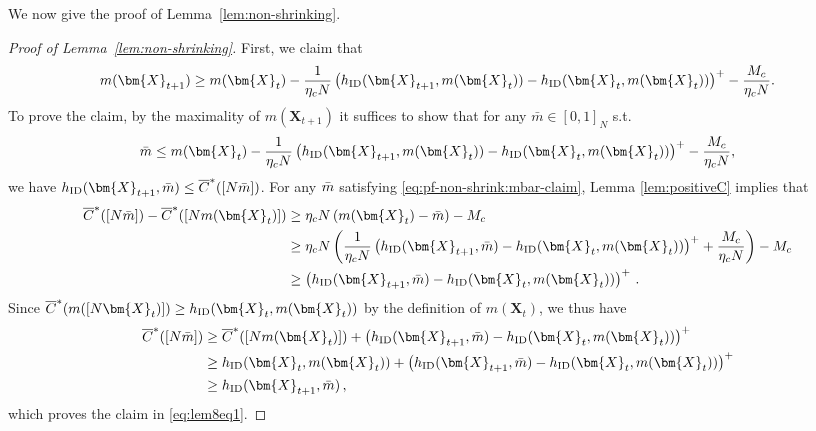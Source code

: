 \documentclass{article}
\theoremstyle{plain}
\theoremstyle{remark}
\newcommand{\ID}{\textnormal{ID}}
\newcommand{\rembud}{\overline{C}^*} %
\def\mX{{\bm{X}}}
\newcommand{\bracket}[1]{\left(#1\right)}
\begin{document}
We now give the proof of Lemma~\ref{lem:non-shrinking}.
\begin{proof}[Proof of Lemma~\ref{lem:non-shrinking}]
    First, we claim that 
    \begin{align}\label{eq:lem8eq1}
        m(\mX_{t+1})\geq m(\mX_t) - \frac{1}{\eta_c N} \bracket{h_{\ID}(\mX_{t+1},m(\mX_{t}))-h_{\ID}(\mX_t,m(\mX_t))}^+ - \frac{M_c}{\eta_cN}.
    \end{align}
    To prove the claim, by the maximality of $m(\mX_{t+1})$ it suffices to show that for any $\bar{m}\in [0,1]_N$ s.t.
    \begin{equation}
        \label{eq:pf-non-shrink:mbar-claim}
        \Bar{m}\leq m(\mX_t) - \frac{1}{\eta_cN} \bracket{h_{\ID}(\mX_{t+1},m(\mX_t))-h_{\ID}(\mX_t,m(\mX_t))}^+ -\frac{M_c}{\eta_cN},
    \end{equation}
    we have $h_{\ID}(\mX_{t+1},\Bar{m})\leq \rembud([N\Bar{m}])$.
    For any $\Bar{m}$ satisfying \eqref{eq:pf-non-shrink:mbar-claim}, Lemma \ref{lem:positiveC} implies that
    \begin{align*}
        \rembud([N\Bar{m}])-\rembud([Nm(\mX_t)])
        &\geq \eta_c N \bracket{m(\mX_t) - \bar{m}} - M_c  \\
        &\geq\eta_c N\bracket{\frac{1}{\eta_c N}\bracket{h_{\ID}(\mX_{t+1},\Bar{m})-h_{\ID}(\mX_t,m(\mX_t))}^++\frac{M_c}{\eta_cN} } - M_c\\
        &\geq\bracket{h_{\ID}(\mX_{t+1},\Bar{m})-h_{\ID}(\mX_t,m(\mX_t))}^+ \,.
    \end{align*}
    Since $\rembud(m([N\mX_t)])\geq h_{\ID}(\mX_t,m(\mX_t))$ by the definition of $m(\mX_t)$, we thus have
    \begin{align*}
        \rembud([N\Bar{m}])&\geq \rembud([Nm(\mX_t)]) + \bracket{h_{\ID}(\mX_{t+1},\Bar{m})-h_{\ID}(\mX_t,m(\mX_t))}^+ \\
        &\geq h_{\ID}(\mX_t,m(\mX_t)) + \bracket{h_{\ID}(\mX_{t+1},\Bar{m})-h_{\ID}(\mX_t,m(\mX_t))}^+ \\
        &\geq h_{\ID}(\mX_{t+1},\Bar{m})\,,
    \end{align*}
    which proves the claim in \eqref{eq:lem8eq1}. 


\end{proof}
\end{document}
